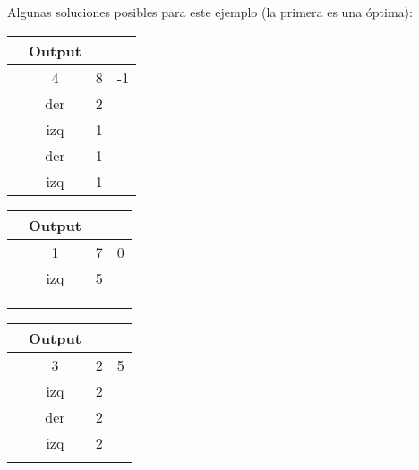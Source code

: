 \documentclass[11pt, a4paper, twoside]{article}
\begin{document}
\begin{ejemplo}
\begin{itemize}
Algunas soluciones posibles para este ejemplo (la primera es una óptima): 
    \begin{center}	
      \begin{minipage}{0.3\textwidth}
          \begin{tabular}{cccc}
            & Output \\
			\hline
			& 4   & 8  & -1 \\
                 & der & 2  & \\
                 & izq & 1  & \\
                 & der & 1  & \\
                 & izq & 1  & \\
          \end{tabular}
      \end{minipage} 
      \begin{minipage}{0.3\textwidth}
          \begin{tabular}{cccc}
            & Output \\
			\hline
			& 1   & 7  & 0 \\
                 & izq & 5  & \\
                 \\
                 \\
                 \\
          \end{tabular}
      \end{minipage}	
      \begin{minipage}{0.3\textwidth}
          \begin{tabular}{cccc}
            & Output \\
			\hline
			& 3   & 2  & 5 \\
                 & izq & 2 & \\
                  & der & 2 &\\
                 & izq & 2 &\\
                 \\
          \end{tabular}
      \end{minipage}	  	  
    \end{center}
	
  \end{itemize}   
    
\end{ejemplo}
\end{document}
